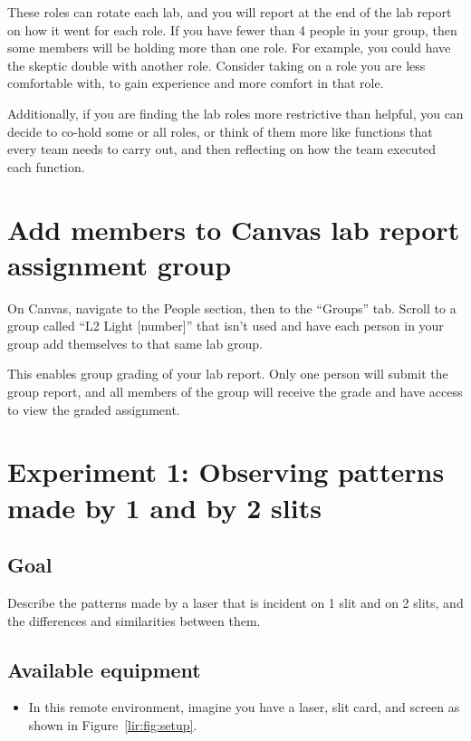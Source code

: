 These roles can rotate each lab, and you will report at the end of the lab report on how it went for each role. If you have fewer than 4 people in your group, then some members will be holding more than one role. For example, you could have the skeptic double with another role. Consider taking on a role you are less comfortable with, to gain experience and more comfort in that role.

Additionally, if you are finding the lab roles more restrictive than helpful, you can decide to co-hold some or all roles, or think of them more like functions that every team needs to carry out, and then reflecting on how the team executed each function.

\section{Add members to Canvas lab report assignment group}

\begin{steps}
	\item On Canvas, navigate to the People section, then to the ``Groups'' tab. Scroll to a group called ``L2 Light [number]'' that isn't used and have each person in your group add themselves to that same lab group.
\end{steps}

This enables group grading of your lab report. Only one person will submit the group report, and all members of the group will receive the grade and have access to view the graded assignment.

\section{Experiment 1: Observing patterns made by 1 and by 2 slits}\label{li:sec:exp1}

\subsection{Goal}

Describe the patterns made by a laser that is incident on 1 slit and on 2 slits, and the differences and similarities between them.

\subsection{Available equipment}

\begin{itemize}
	\item In this remote environment, imagine you have a laser, slit card, and screen as shown in Figure\ \ref{lir:fig:setup}.
\end{itemize}

